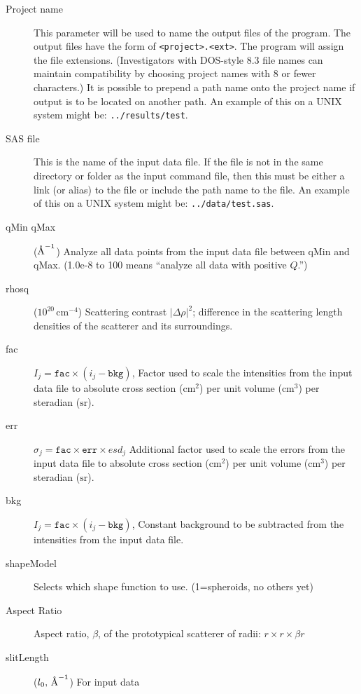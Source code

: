 \documentclass[letterpaper]{article}
\begin{document}
\begin{description}
  \item[Project name] This parameter will be used to 
     name the output files of the program.  The 
     output files have the form of 
     \verb|<project>.<ext>|.  The program will assign 
     the file extensions.  (Investigators with 
     DOS-style 8.3 file names can maintain 
     compatibility by choosing project names with 8 
     or fewer characters.)  It is possible to prepend 
     a path name onto the project name if output is 
     to be located on another path.  An example 
     of this on a UNIX system might be: \verb|../results/test|.
  \item[SAS file] This is the name of the input data 
     file.  If the file is not in the same directory 
     or folder as the input command file, then this 
     must be either a link (or alias) to the file or 
     include the path name to the file.  An example 
     of this on a UNIX system might be: \verb|../data/test.sas|.
  \item[qMin qMax] ($\mbox\AA^{-1}$)  Analyze all data points from the 
   input data file between qMin and qMax.
   (1.0e-8 to 100 means ``analyze all data with 
   positive $Q$.'')
  \item[rhosq] ($10^{20} \, \mbox{cm}^{-4}$)  Scattering 
   contrast ${|\Delta\rho|}^2$; difference 
   in the scattering length densities of the 
   scatterer and its surroundings.
  \item[fac] $I_j = \mathtt{fac} \times ( i_j - \mathtt{bkg})$, 
      Factor used to 
   scale the intensities from the input data file to 
   absolute cross section ($\mbox{cm}^2$) per unit 
   volume ($\mbox{cm}^3$)  per steradian ($\mbox{sr}$).
  \item[err] $\sigma_j = \mathtt{fac} \times 
      \mathtt{err} \times esd_j$  
      Additional factor used to 
   scale the errors from the input data file to 
   absolute cross section ($\mbox{cm}^2$) per unit 
   volume ($\mbox{cm}^3$)  per steradian ($\mbox{sr}$).
  \item[bkg] $I_j = \mathtt{fac} \times ( i_j - \mathtt{bkg})$, 
   Constant 
   background to be subtracted from
   the intensities from the input data file.
  \item[shapeModel]  Selects which shape function to 
   use. (1=spheroids, no others yet)
  \item[Aspect Ratio]  Aspect ratio, $\beta$, of the 
   prototypical scatterer of radii: $r \times r 
   \times \beta r$
  \item[slitLength] ($l_0, \, \mbox\AA^{-1}$) For input data 

\end{description}
\end{document}
